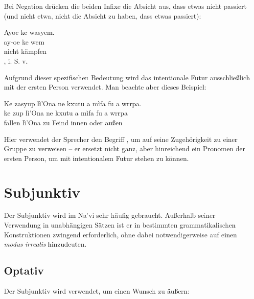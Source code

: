 \noindent Bei Negation drücken die beiden Infixe die Absicht aus, dass etwas nicht passiert (und nicht etwa, nicht die Absicht zu haben, dass etwas passiert):

\begin{interlin}
	\glll Ayoe ke wasyem. \\
	ay-oe ke wem \\
	 nicht kämpfen \\
	, i. S. v. 
\end{interlin}

\noindent Aufgrund dieser spezifischen Bedeutung wird das intentionale Futur ausschließlich mit der ersten Person verwendet. Man beachte aber dieses Beispiel:

\begin{interlin}
	\glll \Npawl{}Ke zasyup lì'Ona ne kxutu a mìfa fu a wrrpa. \\
	ke zup lì'Ona ne kxutu a mìfa fu a wrrpa \\
	 fallen lì'Ona zu Feind  innen oder  außen\\
\end{interlin}

\noindent Hier verwendet der Sprecher den Begriff , um auf seine Zugehörigkeit zu einer Gruppe zu verweisen -- er ersetzt nicht ganz, aber hinreichend ein Pronomen der ersten Person, um mit intentionalem Futur stehen zu können.   \label{syn:verb:intenfut}

\section{Subjunktiv}
\noindent Der Subjunktiv wird im Na'vi sehr häufig gebraucht. Außerhalb seiner Verwendung in unabhängigen Sätzen ist er in bestimmten grammatikalischen Konstruktionen zwingend erforderlich, ohne dabei notwendigerweise auf einen \textit{modus irrealis} hinzudeuten.

\subsection{Optativ} Der Subjunktiv wird verwendet, um einen Wunsch zu äußern:

